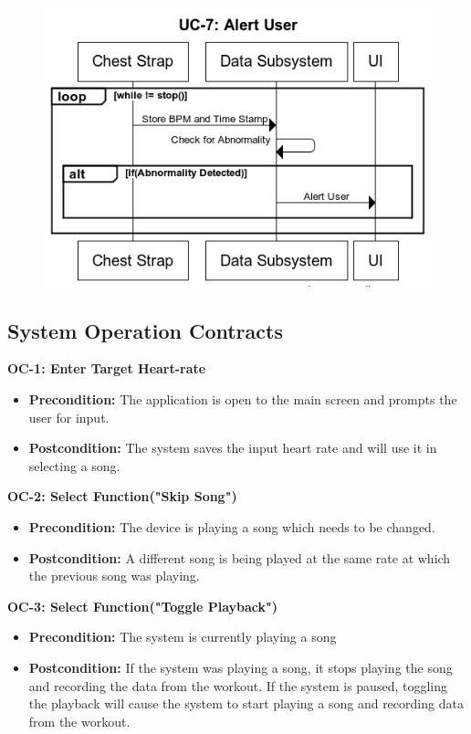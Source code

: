 \documentclass[letterpaper,english, 12pt]{scrreprt}
\begin{document}
\begin{figure}[H]
        \centering
        \includegraphics[width=\textwidth]{img/ssd/ssd_uc7.png}\\
\end{figure}

\subsection{System Operation Contracts}
{\bf OC-1: Enter Target Heart-rate}
\begin{itemize}
        \item {\bf Precondition: } The application is open to the main screen and prompts the user for input.
        \item {\bf Postcondition: } The system saves the input heart rate and will use it in selecting a song.
\end{itemize}

{\bf OC-2: Select Function("Skip Song")}
\begin{itemize}
        \item {\bf Precondition: } The device is playing a song which needs to be changed.
        \item {\bf Postcondition: } A different song is being played at the same rate at which the previous song was playing.

\end{itemize}

{\bf OC-3: Select Function("Toggle Playback")}
\begin{itemize}
        \item {\bf Precondition: } The system is currently playing a song
        \item {\bf Postcondition: } If the system was playing a song, it stops playing the song and recording the data from the workout. If the system is paused, toggling the playback will cause the system to start playing a song and recording data from the workout.

\end{itemize}
\end{document}
